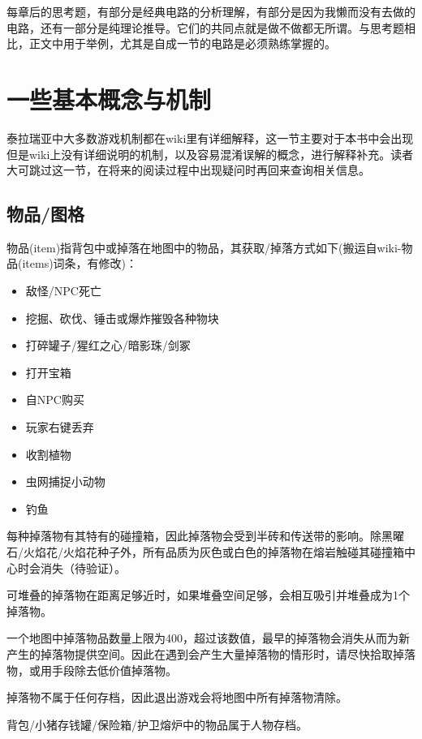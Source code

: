 每章后的思考题，有部分是经典电路的分析理解，有部分是因为我懒而没有去做的电路，还有一部分是纯理论推导。它们的共同点就是做不做都无所谓。与思考题相比，正文中用于举例，尤其是自成一节的电路是必须熟练掌握的。

\section{一些基本概念与机制}

泰拉瑞亚中大多数游戏机制都在wiki里有详细解释，这一节主要对于本书中会出现但是wiki上没有详细说明的机制，以及容易混淆误解的概念，进行解释补充。读者大可跳过这一节，在将来的阅读过程中出现疑问时再回来查询相关信息。

\subsection{物品/图格}

物品(item)指背包中或掉落在地图中的物品，其获取/掉落方式如下(搬运自wiki-物品(items)词条，有修改)：
\begin{itemize}
\item 敌怪/NPC死亡
\item 挖掘、砍伐、锤击或爆炸摧毁各种物块
\item 打碎罐子/猩红之心/暗影珠/剑冢
\item 打开宝箱
\item 自NPC购买
\item 玩家右键丢弃
\item 收割植物
\item 虫网捕捉小动物
\item 钓鱼
\end{itemize}

每种掉落物有其特有的碰撞箱，因此掉落物会受到半砖和传送带的影响。除黑曜石/火焰花/火焰花种子外，所有品质为灰色或白色的掉落物在熔岩触碰其碰撞箱中心时会消失（待验证）。

可堆叠的掉落物在距离足够近时，如果堆叠空间足够，会相互吸引并堆叠成为1个掉落物。

一个地图中掉落物品数量上限为400，超过该数值，最早的掉落物会消失从而为新产生的掉落物提供空间。因此在遇到会产生大量掉落物的情形时，请尽快拾取掉落物，或用手段除去低价值掉落物。

掉落物不属于任何存档，因此退出游戏会将地图中所有掉落物清除。

背包/小猪存钱罐/保险箱/护卫熔炉中的物品属于人物存档。
\\

